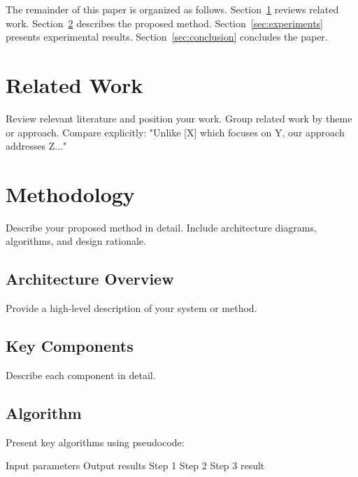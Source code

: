\documentclass[sigconf]{acmart}
\begin{document}
The remainder of this paper is organized as follows. Section~\ref{sec:related} 
reviews related work. Section~\ref{sec:method} describes the proposed method. 
Section~\ref{sec:experiments} presents experimental results. 
Section~\ref{sec:conclusion} concludes the paper.

\section{Related Work}
\label{sec:related}

Review relevant literature and position your work. Group related work by theme 
or approach. Compare explicitly: "Unlike [X] which focuses on Y, our approach 
addresses Z..."

\section{Methodology}
\label{sec:method}

Describe your proposed method in detail. Include architecture diagrams, 
algorithms, and design rationale.

\subsection{Architecture Overview}

Provide a high-level description of your system or method.

\subsection{Key Components}

Describe each component in detail.

\subsection{Algorithm}

Present key algorithms using pseudocode:

\begin{algorithm}
\caption{Algorithm Name}
\label{alg:algorithm}
\begin{algorithmic}[1]
\REQUIRE Input parameters
\ENSURE Output results
\STATE Step 1
\STATE Step 2
\STATE Step 3
\RETURN result
\end{algorithmic}
\end{algorithm}

\end{document}
